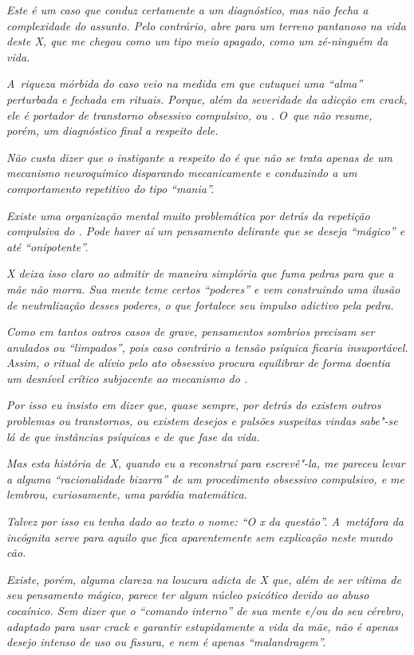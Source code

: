 \emph{Este é um caso que conduz certamente a um diagnóstico, mas não
fecha a complexidade do assunto. Pelo contrário, abre para um terreno
pantanoso na vida deste X, que me chegou como um tipo meio apagado, como
um zé-ninguém da vida.}

\emph{A~riqueza mórbida do caso veio na medida em que cutuquei uma
``alma'' perturbada e fechada em rituais. Porque, além da severidade da
adicção em crack, ele é portador de transtorno obsessivo compulsivo, ou
. O~que não resume, porém, um diagnóstico final a respeito dele.}

\emph{Não custa dizer que o instigante a respeito do  é que não se
trata apenas de um mecanismo neuroquímico disparando mecanicamente e
conduzindo a um comportamento repetitivo do tipo ``mania''.}

\emph{Existe uma organização mental muito problemática por detrás da
repetição compulsiva do . Pode haver aí um pensamento delirante que
se deseja ``mágico'' e até ``onipotente''.}

\emph{X deixa isso claro ao admitir de maneira simplória que fuma pedras
para que a mãe não morra. Sua mente teme certos ``poderes'' e vem
construindo uma ilusão de neutralização desses poderes, o que fortalece
seu impulso adictivo pela pedra.}

\emph{Como em tantos outros casos de  grave, pensamentos sombrios
precisam ser anulados ou ``limpados'', pois caso contrário a tensão
psíquica ficaria insuportável. Assim, o ritual de alívio pelo ato
obsessivo procura equilibrar de forma doentia um desnível crítico
subjacente ao mecanismo do .}

\emph{Por isso eu insisto em dizer que, quase sempre, por detrás do 
existem outros problemas ou transtornos, ou existem desejos e pulsões
suspeitas vindas sabe"-se lá de que instâncias psíquicas e de que fase da
vida.}

\emph{Mas esta história de X, quando eu a reconstruí para escrevê"-la, me
pareceu levar a alguma ``racionalidade bizarra'' de um procedimento
obsessivo compulsivo, e me lembrou, curiosamente, uma paródia
matemática.}

\emph{Talvez por isso eu tenha dado ao texto o nome: ``O x da questão''. A~metáfora da incógnita serve para aquilo que fica aparentemente sem
explicação neste mundo cão.}

\emph{Existe, porém, alguma clareza na loucura adicta de X que, além de
ser vítima de seu pensamento mágico, parece ter algum núcleo psicótico
devido ao abuso cocaínico. Sem dizer que o ``comando interno'' de sua
mente e/ou do seu cérebro, adaptado para usar crack e garantir
estupidamente a vida da mãe, não é apenas desejo intenso de uso ou
fissura, e nem é apenas ``malandragem''.}

